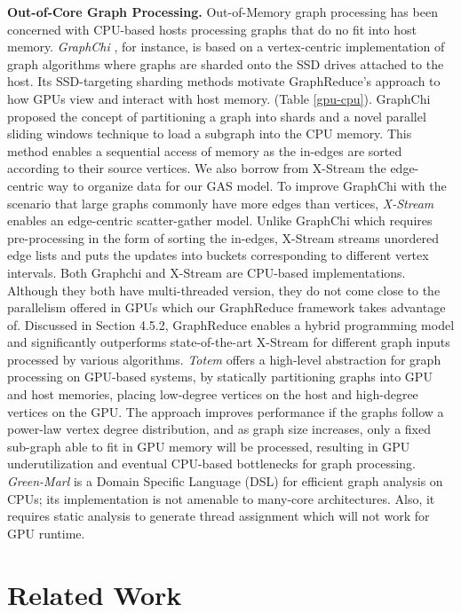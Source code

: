 {\bf Out-of-Core Graph Processing.} Out-of-Memory graph processing has been concerned with CPU-based hosts processing graphs 
that do no fit into host memory. \textit{GraphChi} \cite{chi}, for instance, is based on a vertex-centric implementation of 
graph algorithms where graphs are sharded onto the SSD drives attached to the host. Its SSD-targeting sharding methods motivate 
GraphReduce's approach to how GPUs view and interact with host memory. (Table \ref{gpu-cpu}). 
GraphChi proposed the concept of partitioning a graph into shards and a novel parallel sliding windows technique to load a subgraph into the CPU memory. This method enables a sequential access of memory as the in-edges are sorted according to their source vertices.  
We also borrow from X-Stream \cite{xstream} the edge-centric way to organize data for our GAS model.
To improve GraphChi with the scenario that large graphs commonly have more edges than vertices, \textit{X-Stream} \cite{xstream} enables an edge-centric scatter-gather model. Unlike GraphChi which requires pre-processing in the form of sorting the in-edges, X-Stream streams unordered edge lists and puts the updates into buckets corresponding to different vertex intervals. Both Graphchi and X-Stream are CPU-based implementations. Although they both have multi-threaded version, they do not come close to the parallelism offered in GPUs which our GraphReduce framework takes advantage of. 
Discussed in Section 4.5.2, GraphReduce enables a hybrid programming model and significantly outperforms state-of-the-art X-Stream for different graph inputs processed by various algorithms. 
\textit{Totem} \cite{totem} offers a high-level abstraction for graph processing on GPU-based systems, by statically partitioning graphs 
into GPU and host memories, placing low-degree vertices on the host and high-degree vertices on the GPU. 
The approach improves performance if the graphs follow a power-law vertex degree distribution, and as graph size increases, only
a fixed sub-graph able to fit in GPU memory will be processed, resulting in GPU underutilization and eventual CPU-based bottlenecks
for graph processing. \textit{Green-Marl} \cite{green} is a Domain Specific Language (DSL) 
for efficient graph analysis on CPUs; its implementation is not amenable to many-core architectures. Also, it requires static analysis to generate thread assignment which will not work for GPU runtime. 

\section{Related Work}

